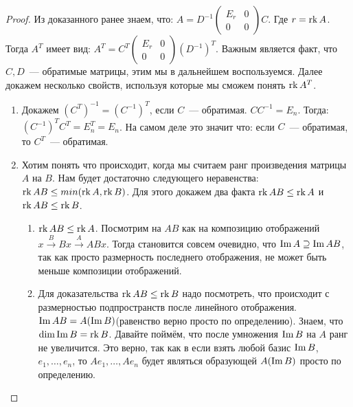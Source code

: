 \begin{proof}\leavevmode
    Из доказанного ранее знаем, что:
    $A = D^{-1}\left(\begin{array}{c|c}
            E_r & 0\\
            \hline
            0 & 0
    \end{array}\right) C$. Где $r = \operatorname{rk} A$. Тогда $A^T$ имеет вид:
    $A^T = C^T \left(\begin{array}{c|c}
            E_r & 0\\
            \hline
            0 & 0
    \end{array}\right)(D^{-1})^T.$ Важным является факт, что $C, D$~---
    обратимые матрицы, этим мы в дальнейшем воспользуемся.
    Далее докажем несколько свойств, используя которые мы сможем понять
    $\operatorname{rk} A^T$.
    \begin{enumerate}
        \item Докажем $(C^T)^{-1} = (C^{-1})^T$, если $C$~--- обратимая.
            $CC^{-1} = E_n$. Тогда: 
            $(C^{-1})^TC^T=E_n^T = E_n$.
            На самом деле это значит что: если $C$~--- обратимая, то
            $C^T$~--- обратимая.
        \item Хотим понять что происходит, когда мы считаем ранг
            произведения матрицы $A$ на $B$.
            Нам будет достаточно следующего неравенства:
            $\operatorname{rk} AB \le min(\operatorname{rk} A, \operatorname{rk} B)$.
            Для этого докажем два факта $\operatorname{rk} AB \le \operatorname{rk} A$ и $\operatorname{rk} AB\le \operatorname{rk} B$.
            \begin{enumerate}
                \item $\operatorname{rk} AB \le \operatorname{rk} A$. 
                    Посмотрим на $AB$ как на композицию отображений $x \xrightarrow{B} Bx \xrightarrow{A} ABx$.
                    Тогда становится совсем очевидно, что $\operatorname{Im} A \supseteq \operatorname{Im} AB$, так как просто размерность
                    последнего отображения, не может быть меньше композиции отображений.
                \item
                    Для доказательства $\operatorname{rk} AB \le \operatorname{rk} B$ надо посмотреть, что происходит с размерностью
                    подпространств после линейного отображения. 
                    $\operatorname{Im} AB = A(\operatorname{Im} B)$(равенство верно просто по определению).
                    Знаем, что $\dim \operatorname{Im} B = \operatorname{rk} B$.
                    Давайте поймём, что после умножения $\operatorname{Im} B$ на $A$ ранг
                    не увеличится. Это верно, так как в если взять любой базис $\operatorname{Im} B$, $e_1,\dots, e_n$,
                    то  $Ae_1, \dots, Ae_n$ будет являться образующей $A(\operatorname{Im} B)$ просто по определению.

\end{enumerate}
\end{enumerate}
\end{proof}
